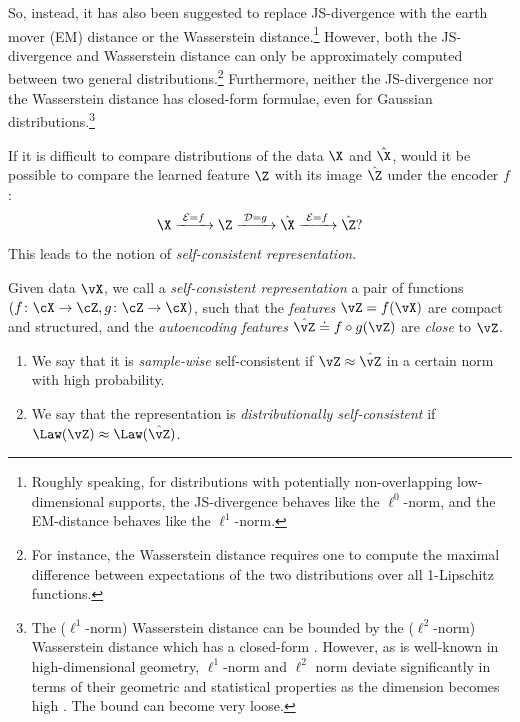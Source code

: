 \documentclass[../../book-main.tex]{subfiles}
\begin{document}
So, instead, it has also been suggested to replace JS-divergence with the earth mover (EM) distance or the Wasserstein distance.\footnote{Roughly speaking, for distributions with potentially non-overlapping low-dimensional supports, the JS-divergence behaves like the $\ell^0$-norm, and the EM-distance behaves like the $\ell^1$-norm.} However, both the JS-divergence and Wasserstein distance can only be approximately computed between two general distributions.\footnote{For instance, the Wasserstein distance requires one to compute the maximal difference between expectations of the two distributions over all 1-Lipschitz functions.} Furthermore, neither the JS-divergence nor the Wasserstein distance has closed-form formulae, even for Gaussian distributions.\footnote{The ($\ell^1$-norm) Wasserstein distance can be bounded by the ($\ell^2$-norm) Wasserstein distance which has a closed-form \cite{salmona2021gromovwasserstein}. However, as is well-known in high-dimensional geometry, $\ell^1$-norm and $\ell^2$ norm deviate significantly in terms of their geometric and statistical properties as the dimension becomes high \cite{Wright-Ma-2021}. The bound can become very loose.} 

If it is difficult to compare distributions of the data $\X$ and $\hat \X$, would it be possible to compare the learned feature $\Z$ with its image $\hat \Z$ under the encoder $f$: 
\begin{equation}
 \X
\xrightarrow{\hspace{1mm} \mathcal{E} = f \hspace{1mm}} \Z  \xrightarrow{\hspace{1mm} \mathcal{D} = g \hspace{1mm}} \hat{\X} \xrightarrow{\hspace{1mm} \mathcal{E} = f \hspace{1mm}} \hat \Z?
\label{eqn:closed-autoencoding}
\end{equation}
This leads to the notion of {\em self-consistent representation}.
\begin{definition}\label{def:closed_loop}
    Given data \(\vX\), we call a \textit{self-consistent representation} a pair of functions \((f \colon \cX \to \cZ, g \colon \cZ \to \cX)\), such that the \textit{features} \(\vZ = f(\vX)\) are compact and structured, and the \textit{autoencoding features} \(\hat{\vZ} \doteq f \circ g(\vZ)\) are \textit{close} to \(\vZ\). 
    \begin{enumerate}
        \item We say that it is \textit{sample-wise} self-consistent if \(\vZ \approx \hat{\vZ}\) in a certain norm with high probability.
        \item We say that the representation is \textit{distributionally self-consistent} if \(\Law(\vZ) \approx \Law(\hat{\vZ})\).
    \end{enumerate}
\end{definition}
\end{document}
